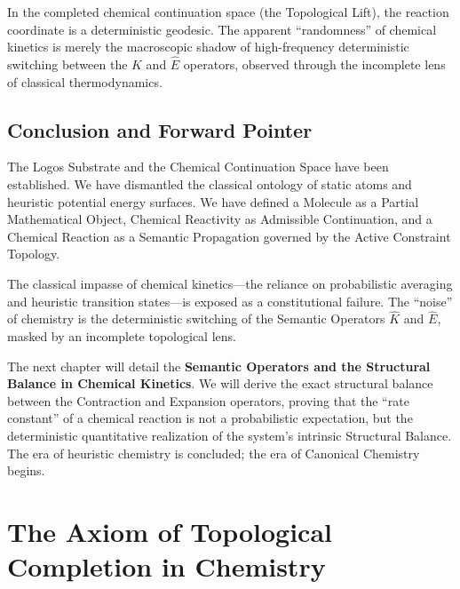 \documentclass[11pt,openany]{extbook}
\theoremstyle{plain}
\theoremstyle{definition}
\begin{document}
In the completed chemical continuation space (the Topological Lift), the reaction coordinate is a deterministic geodesic. The apparent ``randomness'' of chemical kinetics is merely the macroscopic shadow of high-frequency deterministic switching between the $\hat{K}$ and $\hat{E}$ operators, observed through the incomplete lens of classical thermodynamics.

\section{Conclusion and Forward Pointer}

The Logos Substrate and the Chemical Continuation Space have been established. We have dismantled the classical ontology of static atoms and heuristic potential energy surfaces. We have defined a Molecule as a Partial Mathematical Object, Chemical Reactivity as Admissible Continuation, and a Chemical Reaction as a Semantic Propagation governed by the Active Constraint Topology.

The classical impasse of chemical kinetics---the reliance on probabilistic averaging and heuristic transition states---is exposed as a constitutional failure. The ``noise'' of chemistry is the deterministic switching of the Semantic Operators $\hat{K}$ and $\hat{E}$, masked by an incomplete topological lens.

The next chapter will detail the \textbf{Semantic Operators and the Structural Balance in Chemical Kinetics}. We will derive the exact structural balance between the Contraction and Expansion operators, proving that the ``rate constant'' of a chemical reaction is not a probabilistic expectation, but the deterministic quantitative realization of the system's intrinsic Structural Balance. The era of heuristic chemistry is concluded; the era of Canonical Chemistry begins.


\chapter{The Axiom of Topological Completion in Chemistry}

\end{document}
